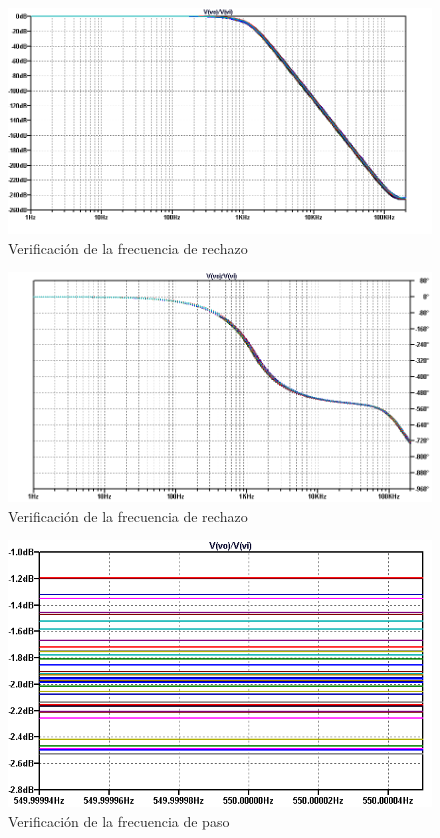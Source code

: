 \begin{figure}[H]
    \centering
    \includegraphics[scale=0.6]{../EJ1/Recursos/bessel_verificacion_magnitud.png}
    \caption{Verificaci\'on de la frecuencia de rechazo}
\end{figure}

\begin{figure}[H]
    \centering
    \includegraphics[scale=0.6]{../EJ1/Recursos/bessel_verificacion_fase.png}
    \caption{Verificaci\'on de la frecuencia de rechazo}
\end{figure}

\begin{figure}[H]
    \centering
    \includegraphics[scale=0.6]{../EJ1/Recursos/bessel_verificacion_fp.png}
    \caption{Verificaci\'on de la frecuencia de paso}
\end{figure}

